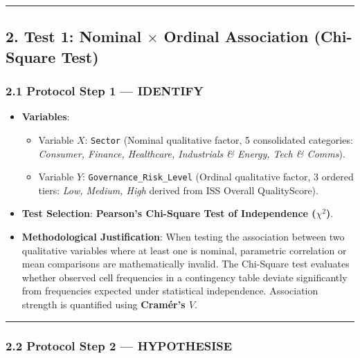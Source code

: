 \documentclass[
]{article}
\providecommand{\tightlist}{%
  \setlength{\itemsep}{0pt}\setlength{\parskip}{0pt}}
\begin{document}
\begin{center}\rule{0.5\linewidth}{0.5pt}\end{center}

\subsection{\texorpdfstring{2. Test 1: Nominal \(\times\) Ordinal
Association (Chi-Square
Test)}{2. Test 1: Nominal \textbackslash times Ordinal Association (Chi-Square Test)}}\label{test-1-nominal-times-ordinal-association-chi-square-test}

\subsubsection{2.1 Protocol Step 1 ---
IDENTIFY}\label{protocol-step-1-identify}

\begin{itemize}
\tightlist
\item
  \textbf{Variables}:

  \begin{itemize}
  \tightlist
  \item
    Variable \(X\): \texttt{Sector} (Nominal qualitative factor, 5
    consolidated categories: \emph{Consumer, Finance, Healthcare,
    Industrials \& Energy, Tech \& Comms}).
  \item
    Variable \(Y\): \texttt{Governance\_Risk\_Level} (Ordinal
    qualitative factor, 3 ordered tiers: \emph{Low, Medium, High}
    derived from ISS Overall QualityScore).
  \end{itemize}
\item
  \textbf{Test Selection}: \textbf{Pearson's Chi-Square Test of
  Independence (\(\chi^2\))}.
\item
  \textbf{Methodological Justification}: When testing the association
  between two qualitative variables where at least one is nominal,
  parametric correlation or mean comparisons are mathematically invalid.
  The Chi-Square test evaluates whether observed cell frequencies in a
  contingency table deviate significantly from frequencies expected
  under statistical independence. Association strength is quantified
  using \textbf{Cramér's \(V\)}.
\end{itemize}

\begin{center}\rule{0.5\linewidth}{0.5pt}\end{center}

\subsubsection{2.2 Protocol Step 2 ---
HYPOTHESISE}\label{protocol-step-2-hypothesise}
\end{document}
